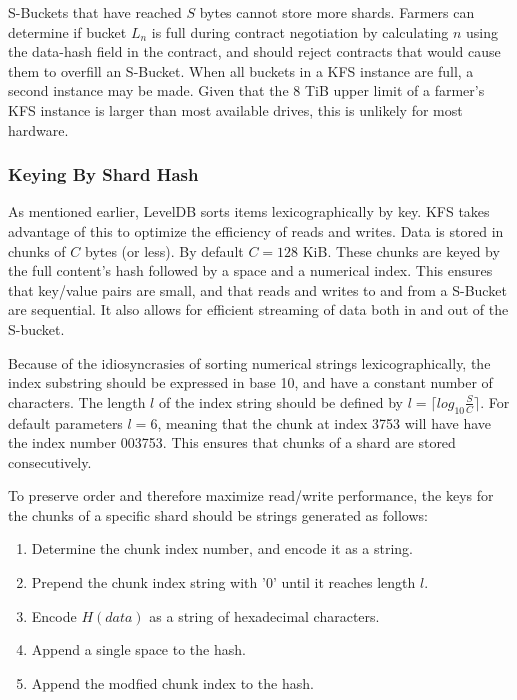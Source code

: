 \documentclass[a4paper,10pt]{article}
\begin{document}
S-Buckets that have reached $ S $ bytes cannot store more shards. Farmers can determine if bucket $ L_{n} $ is full during contract negotiation by calculating $ n $ using the data-hash field in the contract, and should reject contracts that would cause them to overfill an S-Bucket. When all buckets in a KFS instance are full, a second instance may be made. Given that the 8 TiB upper limit of a farmer’s KFS instance is larger than most available drives, this is unlikely for most hardware.

\subsubsection{Keying By Shard Hash}
As mentioned earlier, LevelDB sorts items lexicographically by key. KFS takes advantage of this to optimize the efficiency of reads and writes. Data is stored in chunks of $ C $ bytes (or less). By default $ C = 128 $ KiB. These chunks are keyed by the full content's hash followed by a space and a numerical index. This ensures that key/value pairs are small, and that reads and writes to and from a S-Bucket are sequential. It also allows for efficient streaming of data both in and out of the S-bucket.

Because of the idiosyncrasies of sorting numerical strings lexicographically, the index substring should be expressed in base 10, and have a constant number of characters. The length $ l $ of the index string should be defined by $ l = \lceil log_{10} \frac{S}{C} \rceil $. For default parameters $ l = 6 $, meaning that the chunk at index 3753 will have have the index number 003753. This ensures that chunks of a shard are stored consecutively.

To preserve order and therefore maximize read/write performance, the keys for the chunks of a specific shard should be strings generated as follows:

\begin{enumerate}
\item Determine the chunk index number, and encode it as a string.
\item Prepend the chunk index string with '0' until it reaches length $ l $.
\item Encode $ H(data) $ as a string of hexadecimal characters.
\item Append a single space to the hash.
\item Append the modfied chunk index to the hash.
\end{enumerate}
\end{document}
